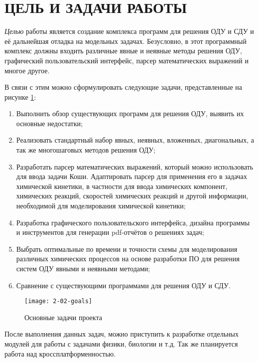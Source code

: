 \section{ЦЕЛЬ И ЗАДАЧИ РАБОТЫ} %

\textit{Целью} работы является создание комплекса программ для решения ОДУ и СДУ и её дальнейшая отладка на модельных задачах.
Безусловно, в этот программный комплекс должны входить различные явные и неявные методы решения ОДУ, графический
пользовательский интерфейс, парсер математических выражений и многое другое.

В связи с этим можно сформулировать следующие задачи, представленные на рисунке \ref{fig:goals}:
\begin{enumerate}
    \item Выполнить обзор существующих программ для решения ОДУ, выявить их основные недостатки;
    \item Реализовать стандартный набор явных, неявных, вложенных, диагональных, а так же многошаговых методов решения ОДУ;
    \item Разработать парсер математических выражений, который можно использовать для ввода задачи Коши. Адаптировать парсер для
    применения его в задачах химической кинетики, в частности для ввода химических компонент, химических реакций, скоростей
    химических реакций и другой информации, необходимой для моделирования химической кинетики;
    \item Разработка графического пользовательского интерфейса, дизайна программы и инструментов для генерации pdf-отчётов о решениях
    задач;
    \item Выбрать оптимальные по времени и точности схемы для моделирования различных химических процессов на основе разработки ПО
    для решения систем ОДУ явными и неявными методами;
    \item Сравнение с существующими программами для решения ОДУ и СДУ.
\end{enumerate}

\begin{figure}
    \texttt{[image: 2-02-goals]}
    \caption{Основные задачи проекта}
    \label{fig:goals}
\end{figure}

После выполнения данных задач, можно приступить к разработке отдельных модулей для работы с задачами физики, биологии и т.д. Так же
планируется работа над кроссплатформенностью.